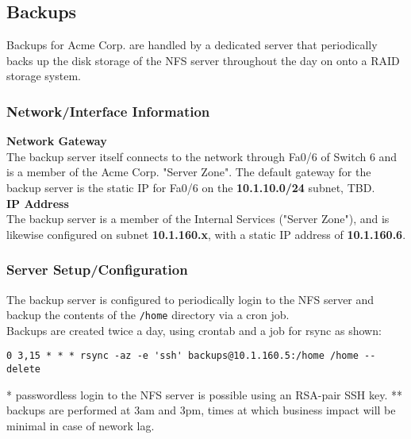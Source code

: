 \subsection{Backups}
Backups for Acme Corp. are handled by a dedicated server that periodically 
backs up the disk storage of the NFS server throughout the day on onto a RAID 
storage system.

\subsubsection{Network/Interface Information}
\textbf{Network Gateway} \\
The backup server itself connects to the network through Fa0/6 of Switch 6 and 
is a member of the Acme Corp. "Server Zone". The default gateway for the backup 
server is the static IP for Fa0/6 on the \textbf{10.1.10.0/24} subnet, TBD. \\

\noindent
\textbf{IP Address} \\
The backup server is a member of the Internal Services ("Server Zone"), and is
likewise configured on subnet \textbf{10.1.160.x}, with a static IP address of 
\textbf{10.1.160.6}. \\

\subsubsection{Server Setup/Configuration}
The backup server is configured to periodically login to the NFS server and
backup the contents of the \lstinline$/home$ directory via a cron job. \\

\noindent
Backups are created twice a day, using crontab and a job for rsync as shown: \\

\begin{lstlisting}[backgroundcolor=\color{Gray}]
 0 3,15 * * * rsync -az -e 'ssh' backups@10.1.160.5:/home /home --delete
\end{lstlisting}
\vspace{1em}
* passwordless login to the NFS server is possible using an RSA-pair SSH key.
** backups are performed at 3am and 3pm, times at which business impact will 
be minimal in case of nework lag.
